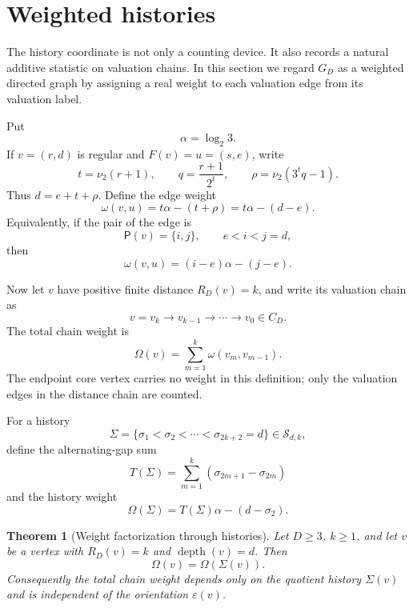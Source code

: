 \documentclass[11pt]{article}
\newtheorem{theorem}{Theorem}[section]
\theoremstyle{definition}
\theoremstyle{remark}
\newcommand{\nuu}{\nu_2}
\newcommand{\depth}{\operatorname{depth}}
\newcommand{\Pair}{\mathsf P}
\newcommand{\Sfam}{\mathcal S}
\newcommand{\eps}{\varepsilon}
\begin{document}
\section{Weighted histories}\label{sec:weighted}

The history coordinate is not only a counting device.  It also records a natural additive statistic on valuation chains.  In this section we regard $G_D$ as a weighted directed graph by assigning a real weight to each valuation edge from its valuation label.

Put
\[
\alpha=\log_2 3.
\]
If $v=(r,d)$ is regular and $F(v)=u=(s,e)$, write
\[
t=\nuu(r+1),\qquad q=\frac{r+1}{2^t},\qquad \rho=\nuu(3^tq-1).
\]
Thus $d=e+t+\rho$.  Define the edge weight
\[
\omega(v,u)=t\alpha-(t+\rho)=t\alpha-(d-e).
\]
Equivalently, if the pair of the edge is
\[
\Pair(v)=\{i,j\},\qquad e<i<j=d,
\]
then
\[
\omega(v,u)=(i-e)\alpha-(j-e).
\]

Now let $v$ have positive finite distance $R_D(v)=k$, and write its valuation chain as
\[
v=v_k\to v_{k-1}\to\cdots\to v_0\in C_D.
\]
The total chain weight is
\[
\Omega(v)=\sum_{m=1}^k \omega(v_m,v_{m-1}).
\]
The endpoint core vertex carries no weight in this definition; only the valuation edges in the distance chain are counted.

For a history
\[
\Sigma=\{\sigma_1<\sigma_2<\cdots<\sigma_{2k+2}=d\}\in\Sfam_{d,k},
\]
define the alternating-gap sum
\[
T(\Sigma)=\sum_{m=1}^k(\sigma_{2m+1}-\sigma_{2m})
\]
and the history weight
\[
\Omega(\Sigma)=T(\Sigma)\alpha-(d-\sigma_2).
\]

\begin{theorem}[Weight factorization through histories]\label{thm:weightfactor}
Let $D\ge3$, $k\ge1$, and let $v$ be a vertex with $R_D(v)=k$ and $\depth(v)=d$.  Then
\[
\Omega(v)=\Omega(\Sigma(v)).
\]
Consequently the total chain weight depends only on the quotient history $\Sigma(v)$ and is independent of the orientation $\eps(v)$.
\end{theorem}
\end{document}
